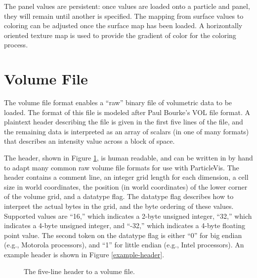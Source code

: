 The panel values are persistent: once values are loaded onto a particle and panel, they will remain until another is specified.  The mapping from surface values to coloring can be adjusted once the surface map has been loaded.  A horizontally oriented texture map is used to provide the gradient of color for the coloring process.

\section{Volume File}

The volume file format enables a ``raw'' binary file of volumetric data to be loaded.  The format of this file is modeled after Paul Bourke's VOL file format.  A plaintext header describing the file is given in the first five lines of the file, and the remaining data is interpreted as an array of scalars (in one of many formats) that describes an intensity value across a block of space.

The header, shown in Figure \ref{vol-header}, is human readable, and can be written in by hand to adapt many common raw volume file formats for use with ParticleVis.  The header contains a comment line, an integer grid length for each dimension, a cell size in world coordinates, the position (in world coordinates) of the lower corner of the volume grid, and a datatype flag.  The datatype flag describes how to interpret the actual bytes in the grid, and the byte ordering of these values.  Supported values are ``16,'' which indicates a 2-byte unsigned integer, ``32,'' which indicates a 4-byte unsigned integer, and ``-32,'' which indicates a 4-byte floating point value.  The second token on the datatype flag is either ``0'' for big endian (e.g., Motorola processors), and ``1'' for little endian (e.g., Intel processors).  An example header is shown in Figure \ref{example-header}.

\begin{figure}
\centering
{}
\caption[The five-line header to a volume file]{The five-line header to a volume file.}
\label{vol-header}
\end{figure}

